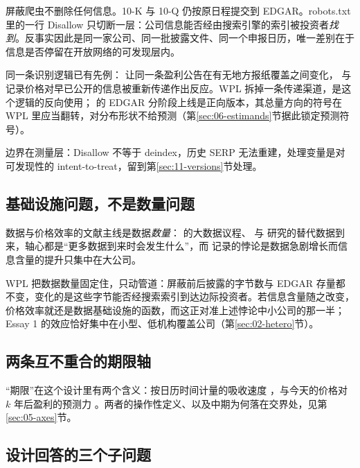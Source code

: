 \documentclass[a4paper,11pt]{ctexart}
\begin{document}
屏蔽爬虫不删除任何信息。10-K 与 10-Q 仍按原日程提交到 EDGAR。robots.txt 里的一行 Disallow 只切断一层：公司信息能否经由搜索引擎的索引被投资者\emph{找到}。反事实因此是同一家公司、同一批披露文件、同一个申报日历，唯一差别在于信息是否停留在开放网络的可发现层内。

同一条识别逻辑已有先例：\citet{engelbergparsons2011} 让同一条盈利公告在有无地方报纸覆盖之间变化，\citet{hubermanregev2001} 与 \citet{tetlock2011} 记录价格对早已公开的信息被重新传递作出反应。WPL 拆掉一条传递渠道，是这个逻辑的反向使用；\citet{gaohuang2020} 的 EDGAR 分阶段上线是正向版本，其总量方向的符号在 WPL 里应当翻转，对分布形状不给预测（第\ref{sec:06-estimands}节据此锁定预测符号）。

边界在测量层：Disallow 不等于 deindex，历史 SERP 无法重建，处理变量是对可发现性的 intent-to-treat，留到第\ref{sec:11-versions}节处理。

\subsection{基础设施问题，不是数量问题}\label{sec:03-infra}

数据与价格效率的文献主线是数据\emph{数量}：\citet{goldsteinspattye2021,goldsteinspattye2025} 的大数据议程、\citet{zhu2019} 与 \citet{dessaintfoucaultfresard2024} 研究的替代数据到来，轴心都是“更多数据到来时会发生什么”，而 \citet{farboodietal2022} 记录的悖论是数据急剧增长而信息含量的提升只集中在大公司。

WPL 把数据数量固定住，只动管道：屏蔽前后披露的字节数与 EDGAR 存量都不变，变化的是这些字节能否经搜索索引到达边际投资者。若信息含量随之改变，价格效率就还是数据基础设施的函数，而这正对准上述悖论中小公司的那一半；Essay 1 的效应恰好集中在小型、低机构覆盖公司（第\ref{sec:02-hetero}节）。

\subsection{两条互不重合的期限轴}\label{sec:03-axes}

“期限”在这个设计里有两个含义：按日历时间计量的吸收速度 \citep{houmoskowitz2005,lomackinlay1988}，与今天的价格对 $k$ 年后盈利的预测力 \citep{baiphilipponsavov2016}。两者的操作性定义、以及中期为何落在交界处，见第\ref{sec:05-axes}节。

\subsection{设计回答的三个子问题}\label{sec:03-subq}
\end{document}

